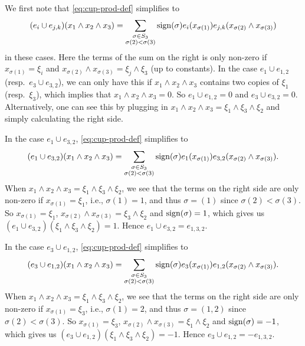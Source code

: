 We first note that \eqref{eq:cup-prod-def} simplifies to
\begin{equation*}
  (e_{i} \cup e_{j,k})(x_{1} \wedge x_{2} \wedge x_{3}) = \sum_{\substack{\sigma \in S_{3} \\ \sigma(2) < \sigma(3)}} \operatorname{sign}(\sigma) e_{i}(x_{\sigma(1)}) e_{j,k}(x_{\sigma(2)} \wedge x_{\sigma(3)})
\end{equation*}
in these cases. Here the terms of the sum on the right is only non-zero if $x_{\sigma(1)} = \xi_{i}$ and $x_{\sigma(2)} \wedge x_{\sigma(3)} = \xi_{j} \wedge \xi_{3}$ (up to constants). In the case $e_{1} \cup e_{1,2}$ (resp.\ $e_{3} \cup e_{3,2}$), we can only have this if $x_{1} \wedge x_{2} \wedge x_{3}$ contains two copies of $\xi_{1}$ (resp.\ $\xi_{3}$), which implies that $x_{1} \wedge x_{2} \wedge x_{3} = 0$. So $e_{1} \cup e_{1,2} = 0$ and $e_{3} \cup e_{3,2} = 0$. Alternatively, one can see this by plugging in $x_{1} \wedge x_{2} \wedge x_{3} = \xi_{1} \wedge \xi_{3} \wedge \xi_{2}$ and simply calculating the right side.

In the case $e_{1} \cup e_{3,2}$, \eqref{eq:cup-prod-def} simplifies to
\begin{equation*}
  (e_{1} \cup e_{3,2})(x_{1} \wedge x_{2} \wedge x_{3}) = \sum_{\substack{\sigma \in S_{3} \\ \sigma(2) < \sigma(3)}} \operatorname{sign}(\sigma) e_{1}(x_{\sigma(1)}) e_{3,2}(x_{\sigma(2)} \wedge x_{\sigma(3)}).
\end{equation*}
When $x_{1} \wedge x_{2} \wedge x_{3} = \xi_{1} \wedge \xi_{3} \wedge \xi_{2}$, we see that the terms on the right side are only non-zero if $x_{\sigma(1)} = \xi_{1}$, i.e., $\sigma(1)=1$, and thus $\sigma = (1)$ since $\sigma(2) < \sigma(3)$. So $x_{\sigma(1)} = \xi_{1}$, $x_{\sigma(2)} \wedge x_{\sigma(3)} = \xi_{3} \wedge \xi_{2}$ and $\operatorname{sign}(\sigma) = 1$, which gives us $(e_{1} \cup e_{3,2})(\xi_{1} \wedge \xi_{3} \wedge \xi_{2}) = 1$. Hence $e_{1} \cup e_{3,2} = e_{1,3,2}$.

In the case $e_{3} \cup e_{1,2}$, \eqref{eq:cup-prod-def} simplifies to
\begin{equation*}
  (e_{3} \cup e_{1,2})(x_{1} \wedge x_{2} \wedge x_{3}) = \sum_{\substack{\sigma \in S_{3} \\ \sigma(2) < \sigma(3)}} \operatorname{sign}(\sigma) e_{3}(x_{\sigma(1)}) e_{1,2}(x_{\sigma(2)} \wedge x_{\sigma(3)}).
\end{equation*}
When $x_{1} \wedge x_{2} \wedge x_{3} = \xi_{1} \wedge \xi_{3} \wedge \xi_{2}$, we see that the terms on the right side are only non-zero if $x_{\sigma(1)} = \xi_{3}$, i.e., $\sigma(1)=2$, and thus $\sigma = (1,2)$ since $\sigma(2) < \sigma(3)$. So $x_{\sigma(1)} = \xi_{3}$, $x_{\sigma(2)} \wedge x_{\sigma(3)} = \xi_{1} \wedge \xi_{2}$ and $\operatorname{sign}(\sigma) = -1$, which gives us $(e_{3} \cup e_{1,2})(\xi_{1} \wedge \xi_{3} \wedge \xi_{2}) = -1$. Hence $e_{3} \cup e_{1,2} = -e_{1,3,2}$.

